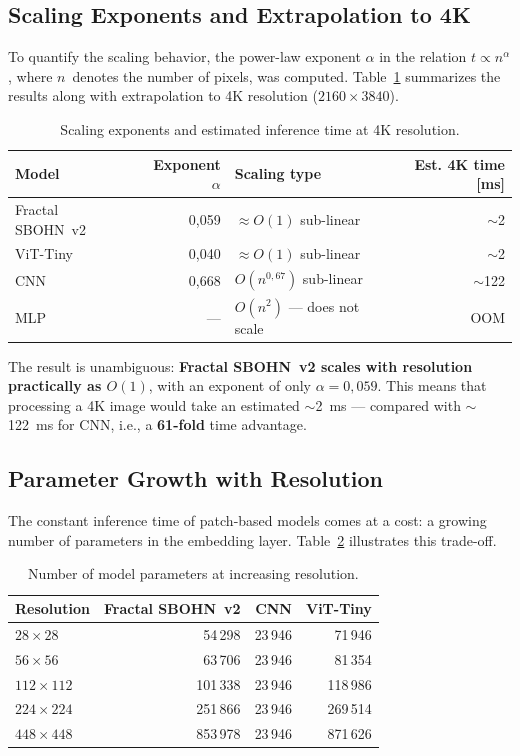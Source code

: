 \documentclass[11pt,a4paper]{report}
\begin{document}
\subsection{Scaling Exponents and Extrapolation to 4K}

To quantify the scaling behavior, the power-law exponent $\alpha$ in the relation $t \propto n^\alpha$, where $n$~denotes the number of pixels, was computed. Table~\ref{tab:sota_scaling} summarizes the results along with extrapolation to 4K resolution ($2160\times3840$).

\begin{table}[htbp]
\centering
\caption{Scaling exponents and estimated inference time at 4K resolution.}
\label{tab:sota_scaling}
\begin{tabular}{|l|r|l|r|}
\hline
\textbf{Model} & \textbf{Exponent $\alpha$} & \textbf{Scaling type} & \textbf{Est. 4K time [ms]} \\
\hline
Fractal SBOHN~v2 & 0,059 & $\approx O(1)$ sub-linear & $\sim$2 \\
\hline
ViT-Tiny & 0,040 & $\approx O(1)$ sub-linear & $\sim$2 \\
\hline
CNN & 0,668 & $O(n^{0{,}67})$ sub-linear & $\sim$122 \\
\hline
MLP & --- & $O(n^2)$ --- does not scale & OOM \\
\hline
\end{tabular}
\end{table}

The result is unambiguous: \textbf{Fractal SBOHN~v2 scales with resolution practically as $O(1)$}, with an exponent of only $\alpha = 0{,}059$. This means that processing a 4K image would take an estimated $\sim$2~ms --- compared with $\sim$122~ms for CNN, i.e., a \textbf{61-fold} time advantage.

\subsection{Parameter Growth with Resolution}

The constant inference time of patch-based models comes at a cost: a growing number of parameters in the embedding layer. Table~\ref{tab:sota_params} illustrates this trade-off.

\begin{table}[htbp]
\centering
\caption{Number of model parameters at increasing resolution.}
\label{tab:sota_params}
\begin{tabular}{|l|r|r|r|}
\hline
\textbf{Resolution} & \textbf{Fractal SBOHN~v2} & \textbf{CNN} & \textbf{ViT-Tiny} \\
\hline
$28\times28$ & 54\,298 & 23\,946 & 71\,946 \\
\hline
$56\times56$ & 63\,706 & 23\,946 & 81\,354 \\
\hline
$112\times112$ & 101\,338 & 23\,946 & 118\,986 \\
\hline
$224\times224$ & 251\,866 & 23\,946 & 269\,514 \\
\hline
$448\times448$ & 853\,978 & 23\,946 & 871\,626 \\
\hline
\end{tabular}
\end{table}
\end{document}
